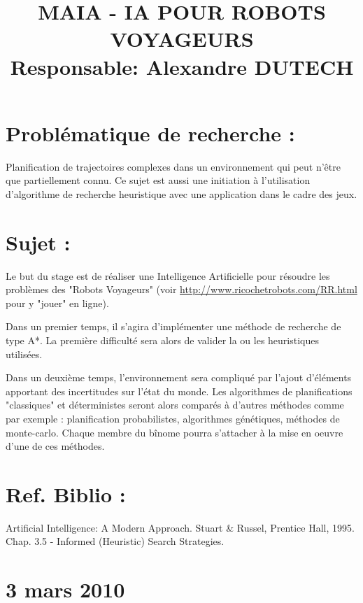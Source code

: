\documentclass[a4paper,10pt]{article}
\title{MAIA - IA POUR ROBOTS VOYAGEURS\\Responsable: Alexandre DUTECH}
\author{}
\date{}
\begin{document}
\maketitle


\section*{Probl\'ematique de recherche :}
Planification de trajectoires complexes dans un environnement qui peut
n'être que partiellement connu. Ce sujet est aussi une initiation \`a
l'utilisation d'algorithme de recherche heuristique avec une
application dans le cadre des jeux.

\section*{Sujet :}
Le but du stage est de r\'ealiser une Intelligence Artificielle pour
r\'esoudre les probl\`emes des "Robots Voyageurs" (voir
\url{http://www.ricochetrobots.com/RR.html} pour y "jouer" en ligne).

Dans un premier temps, il s'agira d'impl\'ementer une m\'ethode de
recherche de type A*. La premi\`ere difficult\'e sera alors de valider la
ou les heuristiques utilis\'ees.

Dans un deuxi\`eme temps, l'environnement sera compliqu\'e par l'ajout
d'\'el\'ements apportant des incertitudes sur l'\'etat du monde. Les
algorithmes de planifications "classiques" et d\'eterministes seront alors
compar\'es \`a d'autres m\'ethodes comme par exemple : planification
probabilistes, algorithmes g\'en\'etiques, m\'ethodes de monte-carlo. Chaque
membre du bînome pourra s'attacher \`a la mise en oeuvre d'une de ces
m\'ethodes.

\section*{Ref. Biblio :}

\cite{AIMA} Artificial Intelligence: A Modern Approach. Stuart \&
Russel, Prentice Hall, 1995. Chap. 3.5 - Informed (Heuristic) Search
Strategies.

\newpage

\section{3 mars 2010}
\end{document}
